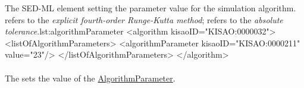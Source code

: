\begin{myXmlLst}{The SED-ML  element setting the parameter value for the simulation algorithm.  refers to the \emph{explicit fourth-order Runge-Kutta method};  refers to the \emph{absolute tolerance}.}{lst:algorithmParameter}
<algorithm kisaoID="KISAO:0000032"> 
	<listOfAlgorithmParameters> 
		<algorithmParameter kisaoID="KISAO:0000211" value="23"/> 
	</listOfAlgorithmParameters> 
</algorithm>
\end{myXmlLst}


\paragraph*{}
\label{sec:algorithmParameterValue}
The  sets the value of the \hyperref[class:algorithmParameter]{AlgorithmParameter}.

